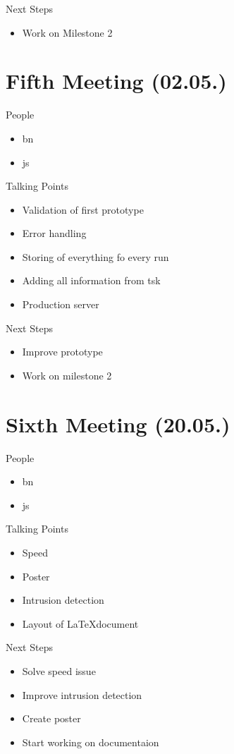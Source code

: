 Next Steps
\begin{itemize}
    \item Work on Milestone 2
\end{itemize}

\section{Fifth Meeting (02.05.)}
\label{sec:meeting05}

People
\begin{itemize}
    \item \gls{bn}
    \item \gls{js}
\end{itemize}

Talking Points
\begin{itemize}
    \item Validation of first prototype
    \item Error handling
    \item Storing of everything fo every run
    \item Adding all information from \gls{tsk}
    \item Production server
\end{itemize}

Next Steps
\begin{itemize}
    \item Improve prototype
    \item Work on milestone 2
\end{itemize}

\section{Sixth Meeting (20.05.)}
\label{sec:meeting06}

People
\begin{itemize}
    \item \gls{bn}
    \item \gls{js}
\end{itemize}

Talking Points
\begin{itemize}
    \item Speed
    \item Poster
    \item Intrusion detection 
    \item Layout of \LaTeX document
\end{itemize}

Next Steps
\begin{itemize}
    \item Solve speed issue
    \item Improve intrusion detection
    \item Create poster
    \item Start working on documentaion
\end{itemize}


